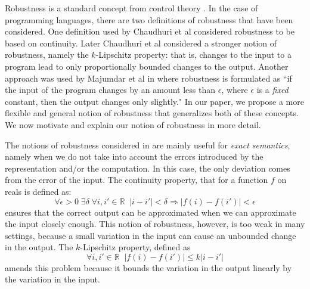 \documentclass[copyright,creativecommons]{eptcs}
\newcommand{\R}{\mathbb{R}}
\begin{document}
Robustness is a standard concept from control theory
\cite{pettersson96dc,parsec09}.  In the case of programming languages,
there are two definitions of robustness that have been considered.
One definition used by Chaudhuri et al \cite{chaudhuri10popl}
considered robustness to be based on continuity.  Later Chaudhuri et
al \cite{chaudhuri11sigsoft} considered a stronger notion of
robustness, namely the $k$-Lipschitz property: that is, 
changes to the input to a program lead to only proportionally bounded
changes to the output.
Another approach was used by Majumdar et al in
\cite{majumdar09rtss,majumdar10memocode} where robustness is
formulated as ``if the input of the program changes by an amount less
than $\epsilon$, where $\epsilon$ is a {\em fixed} constant, then the
output changes only slightly."  In our paper, we propose a more
flexible and general notion of robustness that generalizes both of
these concepts.  We now motivate and explain our notion of robustness
in more detail.

The notions of robustness considered in
\cite{chaudhuri10popl,chaudhuri11sigsoft} are mainly useful for
\emph{exact semantics}, namely when we do not take into account the
errors introduced by the representation and/or the computation. In
this case, the only deviation  comes from the  error of the input. The
continuity property, that for a function $f$ on reals is defined as:  
\[\forall \epsilon>0\; \exists \delta\; \forall i,i'\in \R\;  \;
|i-i'|<\delta \Rightarrow |f(i)-f(i')| < \epsilon\]
ensures that the correct output can be approximated when we can
approximate the input closely enough.   This notion of robustness,
however, is too weak in many settings, because a small  variation in
the input can cause an unbounded change in the output. The
$k$-Lipschitz property, defined as
\[\forall i,i' \in \R\; \;|f(i)-f(i')| \leq k |i-i'|\]
amends this problem because it bounds the variation in the output
linearly by the variation in the input.
\end{document}
